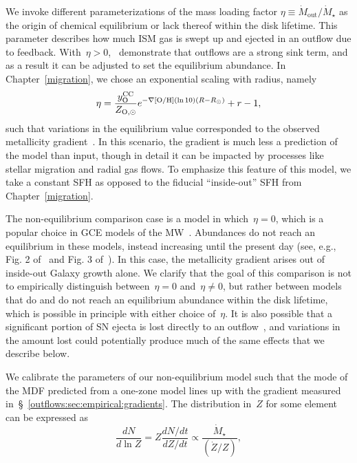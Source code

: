 We invoke different parameterizations of the mass loading factor
$\eta \equiv \dot{M}_\text{out} / \dot{M}_\star$ as the origin of chemical
equilibrium or lack thereof within the disk lifetime.
This parameter describes how much ISM gas is swept up and ejected in an outflow
due to feedback.
With~$\eta > 0$,~\citet{Weinberg2017b} demonstrate that outflows are a strong
sink term, and as a result it can be adjusted to set the equilibrium abundance.
In Chapter~\ref{migration}, we chose an exponential scaling with radius, namely
\begin{equation}
\eta = \frac{y_\text{O}^\text{CC}}{Z_{\text{O},\odot}}
e^{-\nabla\text{[O/H]} (\ln 10) (R - R_\odot)} + r - 1,
\end{equation}
such that variations in the equilibrium value corresponded to the observed
metallicity gradient~.
In this scenario, the gradient is much less a prediction of the model than
input, though in detail it can be impacted by processes like stellar migration
and radial gas flows.
To emphasize this feature of this model, we take a constant SFH as opposed to
the fiducial ``inside-out'' SFH from Chapter~\ref{migration}.
\par
The non-equilibrium comparison case is a model in which~$\eta = 0$, which is a
popular choice in GCE models of the MW~\citep[e.g.,][]{Minchev2013,
Minchev2014, Spitoni2019, Spitoni2021}.
Abundances do not reach an equilibrium in these models, instead increasing
until the present day (see, e.g., Fig. 2 of~\citealt{Minchev2013} and Fig. 3
of~\citealt{Spitoni2021}).
In this case, the metallicity gradient arises out of inside-out Galaxy growth
alone.
We clarify that the goal of this comparison is not to empirically distinguish
between~$\eta = 0$ and~$\eta \neq 0$, but rather between models that do and do
not reach an equilibrium abundance within the disk lifetime, which is possible
in principle with either choice of~$\eta$.
It is also possible that a significant portion of SN ejecta is lost directly to
an outflow~\citep{Dalcanton2007, Peeples2011, Christensen2018, Chisholm2018,
Cameron2021}, and variations in the amount lost could potentially produce much
of the same effects that we describe below.
\par
We calibrate the parameters of our non-equilibrium model such that the mode of
the MDF predicted from a one-zone model lines up with the gradient measured
in~\S~\ref{outflows:sec:empirical:gradients}.
The distribution in~$Z$ for some element can be expressed as
\begin{equation}
\frac{dN}{d \ln Z} = Z \frac{dN / dt}{dZ / dt}
\propto \frac{\dot{M}_\star}{(\dot{Z} / Z)},
\end{equation}
